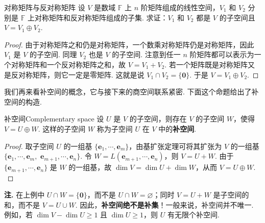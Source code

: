 \documentclass[12pt, a4paper,newtx]{ctexart}
\newenvironment{remark}{\dbend\textbf{注. }}{}{}
\begin{document}
\begin{example}{对称矩阵与反对称矩阵}{}
	设 $V$ 是数域 $\mathbb F$ 上 $n$ 阶矩阵组成的线性空间，$V_1$ 和 $V_2$ 分别是 $\mathbb F$ 上对称矩阵和反对称矩阵组成的子集. 求证：$V_1$ 和 $V_2$ 都是 $V$ 的子空间且 $V = V_1 \oplus V_2$.
\end{example}
\begin{proof}
	由于对称矩阵之和仍是对称矩阵，一个数乘对称矩阵仍是对称矩阵，因此 $V_1$ 是 $V$ 的子空间. 同理 $V_2$ 也是 $V$ 的子空间. 注意到任一 $n$ 阶矩阵都可以表示为一个对称矩阵和一个反对称矩阵之和，故 $V = V_1 + V_2$. 若一个矩阵既是对称矩阵又是反对称矩阵，则它一定是零矩阵. 这就是说 $V_1 \cap V_2 = \{\bm 0\}$. 于是 $V = V_1 \oplus V_2. $
\end{proof}
我们再来看补空间的概念，它与接下来的商空间联系紧密. 下面这个命题给出了补空间的构造. 
\begin{proposition}{补空间}{Complementary space}
	设 $U$ 是 $V$ 的子空间，则存在 $V$ 的子空间 $W$，使得 $V = U \oplus W$. 
	这样的子空间 $W$ 称为子空间 $U$ 在 $V$ 中的\textbf{补空间}.
\end{proposition}
\begin{proof}
	取子空间 $U$ 的一组基 $\{\bm e_1, \cdots, \bm e_m\}$，由基扩张定理可将其扩张为 $V$ 的一组基 $\{\bm e_1, \cdots, \bm e_m, $
	$\bm e_{m+1}, \cdots, \bm e_n\}$. 令 $W = L(\bm e_{m+1}, \cdots, \bm e_n)$，则 $V = U + W$. 由于 $\{\bm e_{m+1}, \cdots, \bm e_n\}$ 是 $W$ 的一组基，故 $\dim V = \dim U + \dim W$，从而 $V = U \oplus W. $
\end{proof}
\begin{remark}
	在上例中 $U \cap W = \{\bm 0\}$，而不是 $U \cap W = \varnothing$；同时 $V = U + W$ 是子空间的和，而不是 $V = U \cup W$. 因此，\textbf{补空间绝不是补集}！一般来说，补空间并不唯一. 例如，若 $\dim V - \dim U \geqslant 1$ 且 $\dim U \geqslant 1$，则 $U$ 有无限个补空间. 
\end{remark}
\end{document}
